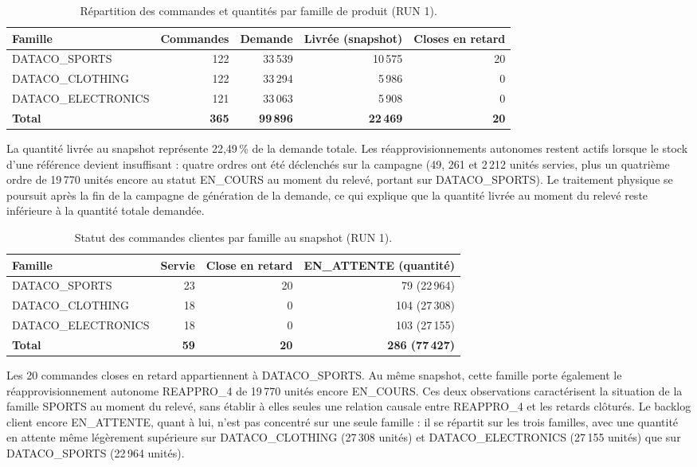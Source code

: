 \documentclass[11pt,a4paper]{article}
\begin{document}
\begin{table}[htbp]
\centering
\small
\caption{Répartition des commandes et quantités par famille de produit (RUN 1).}
\label{tab:dataco-produits}
\begin{tabularx}{\textwidth}{@{}Xrrrr@{}}
\toprule
\textbf{Famille} & \textbf{Commandes} & \textbf{Demande} & \textbf{Livrée (snapshot)} & \textbf{Closes en retard} \\
\midrule
DATACO\_SPORTS & 122 & 33\,539 & 10\,575 & 20 \\
DATACO\_CLOTHING & 122 & 33\,294 & 5\,986 & 0 \\
DATACO\_ELECTRONICS & 121 & 33\,063 & 5\,908 & 0 \\
\midrule
\textbf{Total} & \textbf{365} & \textbf{99\,896} & \textbf{22\,469} & \textbf{20} \\
\bottomrule
\end{tabularx}
\end{table}

La quantité livrée au snapshot représente 22,49\,\% de la demande totale. Les réapprovisionnements autonomes restent actifs lorsque le stock d'une référence devient insuffisant : quatre ordres ont été déclenchés sur la campagne (49, 261 et 2\,212 unités servies, plus un quatrième ordre de 19\,770 unités encore au statut EN\_COURS au moment du relevé, portant sur DATACO\_SPORTS). Le traitement physique se poursuit après la fin de la campagne de génération de la demande, ce qui explique que la quantité livrée au moment du relevé reste inférieure à la quantité totale demandée.

\begin{table}[htbp]
\centering
\small
\caption{Statut des commandes clientes par famille au snapshot (RUN 1).}
\label{tab:dataco-statuts-commandes}
\begin{tabularx}{\textwidth}{@{}Xrrr@{}}
\toprule
\textbf{Famille} & \textbf{Servie} & \textbf{Close en retard} & \textbf{EN\_ATTENTE (quantité)} \\
\midrule
DATACO\_SPORTS & 23 & 20 & 79 (22\,964) \\
DATACO\_CLOTHING & 18 & 0 & 104 (27\,308) \\
DATACO\_ELECTRONICS & 18 & 0 & 103 (27\,155) \\
\midrule
\textbf{Total} & \textbf{59} & \textbf{20} & \textbf{286 (77\,427)} \\
\bottomrule
\end{tabularx}
\end{table}

Les 20 commandes closes en retard appartiennent à DATACO\_SPORTS. Au même snapshot, cette famille porte également le réapprovisionnement autonome REAPPRO\_4 de 19\,770 unités encore EN\_COURS. Ces deux observations caractérisent la situation de la famille SPORTS au moment du relevé, sans établir à elles seules une relation causale entre REAPPRO\_4 et les retards clôturés. Le backlog client encore EN\_ATTENTE, quant à lui, n'est pas concentré sur une seule famille : il se répartit sur les trois familles, avec une quantité en attente même légèrement supérieure sur DATACO\_CLOTHING (27\,308 unités) et DATACO\_ELECTRONICS (27\,155 unités) que sur DATACO\_SPORTS (22\,964 unités).
\end{document}
